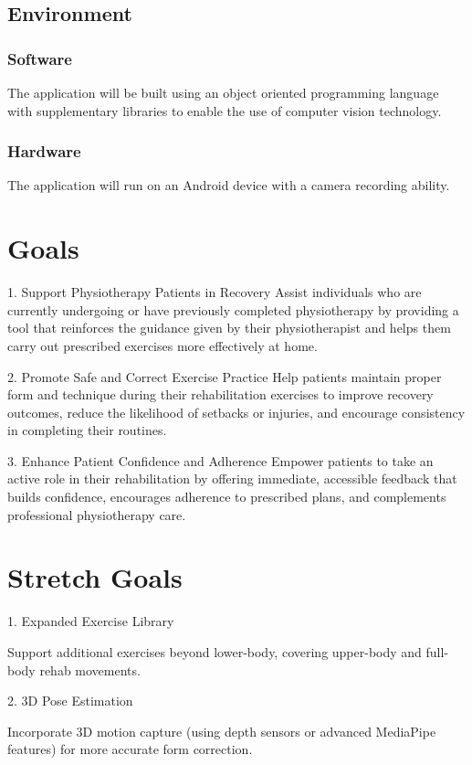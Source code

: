 \documentclass{article}
\begin{document}
\subsection{Environment}
  \subsubsection{Software}
    The application will be built using an object oriented programming language with supplementary libraries to enable the use of computer vision technology. \\
  \subsubsection{Hardware}
    The application will run on an Android device with a camera recording ability.

\section{Goals}

1. Support Physiotherapy Patients in Recovery
Assist individuals who are currently undergoing or have previously completed physiotherapy by providing a tool that reinforces the guidance given by their physiotherapist and helps them carry out prescribed exercises more effectively at home.


2. Promote Safe and Correct Exercise Practice
Help patients maintain proper form and technique during their rehabilitation exercises to improve recovery outcomes, reduce the likelihood of setbacks or injuries, and encourage consistency in completing their routines.


3. Enhance Patient Confidence and Adherence
Empower patients to take an active role in their rehabilitation by offering immediate, accessible feedback that builds confidence, encourages adherence to prescribed plans, and complements professional physiotherapy care.
\section{Stretch Goals}

1. Expanded Exercise Library

Support additional exercises beyond lower-body, covering upper-body and full-body rehab movements.

2. 3D Pose Estimation

Incorporate 3D motion capture (using depth sensors or advanced MediaPipe features) for more accurate form correction.
\end{document}
